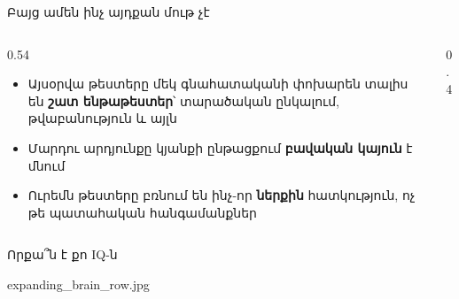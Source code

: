 \begin{frame}{Բայց ամեն ինչ այդքան մութ չէ}
  \begin{columns}[c]
    \begin{column}{0.54\textwidth}
      \begin{itemize}
        \item Այսօրվա թեստերը մեկ գնահատականի փոխարեն տալիս են \textbf{շատ ենթաթեստեր}՝ տարածական ընկալում, թվաբանություն և այլն
        \item<2-> Մարդու արդյունքը կյանքի ընթացքում \textbf{բավական կայուն} է մնում
        \item<3-> Ուրեմն թեստերը բռնում են ինչ-որ \textbf{ներքին} հատկություն, ոչ թե պատահական հանգամանքներ
      \end{itemize}
    \end{column}
    \begin{column}{0.4\textwidth}
      \centering
      \vspace{5mm}
    \end{column}
  \end{columns}
\end{frame}

\begin{frame}{Որքա՞ն է քո IQ-ն}
  \centering
  \begin{meme}[13.4cm]{expanding_brain_row.jpg}
  \end{meme}
\end{frame}
